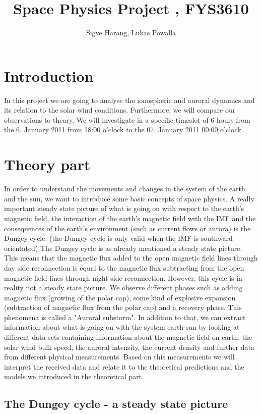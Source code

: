 \documentclass[10pt,a4paper]{article}
\author{Sigve Harang, Lukas Powalla}
\title{Space Physics Project , FYS3610}
\begin{document}
\maketitle
\newpage
\tableofcontents
\newpage
\section*{Introduction}
In this project we are going to analyse the ionospheric and auroral dynamics and its relation to the solar wind conditions. Furthermore, we will compare our observations to theory. We will investigate in a specific timeslot of 6 hours from the 6. January 2011 from 18:00 o'clock to the 07. January 2011 00:00 o'clock.   
\section{Theory part}
In order to understand the movements and changes in the system of the earth and the sun, we want to introduce some basic concepts of space physics. 
A really important steady state picture of what is going on with respect to the earth's magnetic field, the interaction of the earth's magnetic field with the IMF and the consequences of the earth's environment (such as current flows or aurora) is the Dungey cycle. (the Dungey cycle is only valid when the IMF is southward orientated)
The Dungey cycle is as already mentioned a steady state picture. This means that the magnetic flux added to the open magnetic field lines through day side reconnection is equal to the magnetic flux subtracting from the open magnetic field lines through night side reconnection.
However, this cycle is in reality not a steady state picture. We observe different phases such as adding magnetic flux (growing of the polar cap), some kind of explosive expansion (subtraction of magnetic flux from the polar cap) and a recovery phase. This phenomena is called a "Auroral substorm". In addition to that, we can extract information about what is going on with the system earth-sun by looking at different data sets containing information about the magnetic field on earth, the solar wind bulk speed, the auroral intensity, the current density and further data from different physical measurements. 
Based on this measurements we will interpret the received data and relate it to the theoretical predictions and the models we introduced in the theoretical part.

\subsection{The Dungey cycle - a steady state picture \label{Dungey cycle}}
\end{document}
